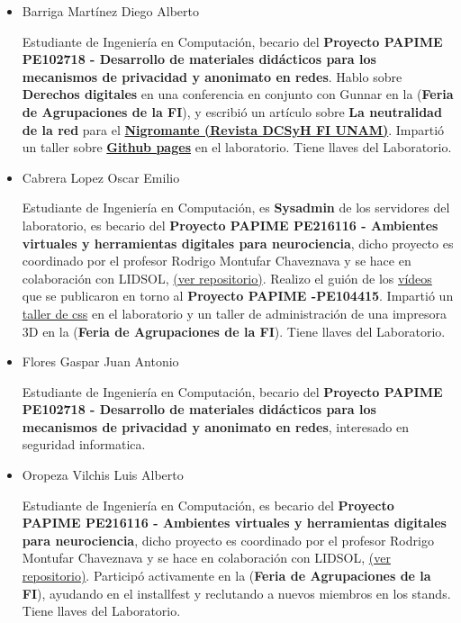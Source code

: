 \documentclass[a4paper,11pt]{article}                 %
\begin{document}
\begin{itemize}
    \item Barriga Martínez Diego Alberto
    
    Estudiante de Ingeniería en Computación, becario del \textbf{Proyecto PAPIME PE102718 - Desarrollo de materiales didácticos para los mecanismos de privacidad y anonimato en redes}. Hablo sobre \textbf{Derechos digitales} en una conferencia en conjunto con Gunnar en la (\textbf{Feria de Agrupaciones de la FI}), y escribió un artículo sobre \textbf{La neutralidad de la red} para el \href{https://issuu.com/nigromantefi}{\textbf{Nigromante  (Revista DCSyH FI  UNAM)}}. Impartió un taller sobre \href{https://github.com/umoqnier/personal-page}{\textbf{Github pages}} en el laboratorio. Tiene llaves del Laboratorio.
    
    \item Cabrera Lopez Oscar Emilio 
    
    Estudiante de Ingeniería en Computación, es \textbf{Sysadmin} de los servidores del laboratorio, es becario del \textbf{Proyecto PAPIME PE216116 - Ambientes virtuales y herramientas digitales para neurociencia}, dicho proyecto es coordinado por el profesor Rodrigo Montufar Chaveznava y se hace en colaboración con LIDSOL, \href{https://github.com/LIDSOL/portia}{(ver repositorio)}. Realizo el guión de los \href{https://www.youtube.com/channel/UCwHFqMqxUcCAJSdek3e4zOw}{vídeos} que se publicaron en torno al  \textbf{Proyecto PAPIME -PE104415}. Impartió un \href{https://lidsol.org/talleres/0002_css_basico.html}{taller de css} en el laboratorio y un taller de administración de una impresora 3D en la (\textbf{Feria de Agrupaciones de la FI}). Tiene llaves del Laboratorio.
    
    \item Flores Gaspar Juan Antonio
    
    Estudiante de Ingeniería en Computación, becario del \textbf{Proyecto PAPIME PE102718 - Desarrollo de materiales didácticos para los mecanismos de privacidad y anonimato en redes}, interesado en seguridad informatica. 
    

    
    \item Oropeza Vilchis Luis Alberto
    
    Estudiante de Ingeniería en Computación, es becario del \textbf{Proyecto PAPIME PE216116 - Ambientes virtuales y herramientas digitales para neurociencia}, dicho proyecto es coordinado por el profesor Rodrigo Montufar Chaveznava y se hace en colaboración con LIDSOL, \href{https://github.com/LIDSOL/portia}{(ver repositorio)}. Participó activamente en la (\textbf{Feria de Agrupaciones de la FI}), ayudando en el installfest y reclutando a nuevos miembros en los stands. Tiene llaves del Laboratorio.
    

\end{itemize}
\end{document}
